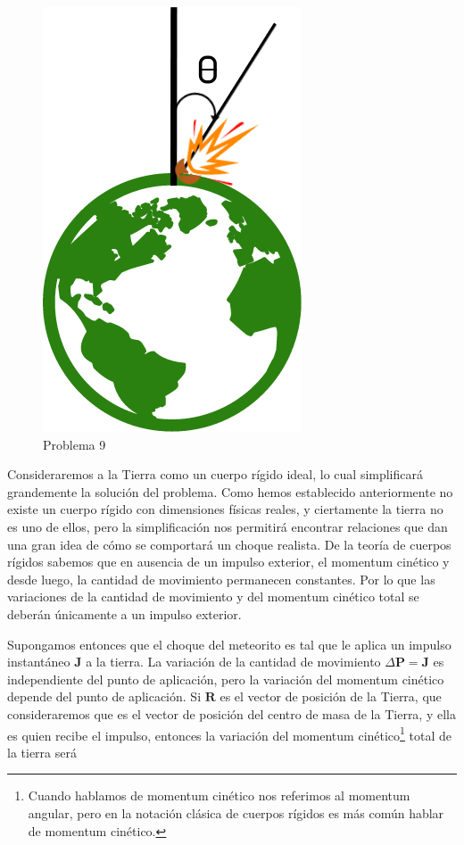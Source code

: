 \documentclass[a4paper,10pt]{article}
\numberwithin{equation}{section}
\begin{document}
\begin{figure}[ht]
 \centering
\includegraphics[scale=0.3]{problema9fig1}
\caption{Problema 9}
\label{fig:problema9}
\end{figure}

Consideraremos a la Tierra como un cuerpo rígido ideal, lo cual simplificará grandemente
la solución del problema. Como hemos establecido anteriormente no existe un cuerpo rígido
con dimensiones físicas reales, y ciertamente la tierra no es uno de ellos, pero la simplificación
nos permitirá encontrar relaciones que dan una gran idea de cómo se comportará un choque
realista. De la teoría de cuerpos rígidos sabemos que en ausencia de un impulso exterior,
el momentum cinético y desde luego, la cantidad de movimiento permanecen constantes. Por 
lo que las variaciones de la cantidad de movimiento y del momentum cinético total se
deberán únicamente a un impulso exterior.

\vspace{.3cm}

Supongamos entonces que el choque del meteorito es tal que le aplica un impulso instantáneo
$\mathbf{J}$ a la tierra. La variación de la cantidad de movimiento $\Delta \mathbf{P} = \mathbf{J}$
es independiente del punto de aplicación, pero la variación del momentum cinético depende
del punto de aplicación. Si $\mathbf{R}$ es el vector de posición de la Tierra, que consideraremos
que es el vector de posición del centro de masa de la Tierra, y ella es quien recibe 
el impulso, entonces la variación del momentum cinético\footnote{Cuando hablamos de momentum cinético nos referimos al momentum angular, pero en la
notación clásica de cuerpos rígidos es más común hablar de momentum cinético.} total
de la tierra será
\end{document}
